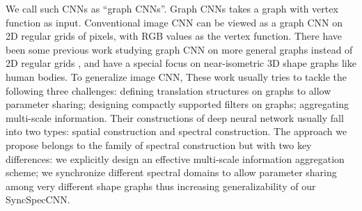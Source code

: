 We call such CNNs as ``graph CNNs''. Graph CNNs takes a graph with vertex function as input. Conventional image CNN can be viewed as a graph CNN on 2D regular grids of pixels, with RGB values as the vertex function. There have been some previous work studying graph CNN on more general graphs instead of 2D regular grids \cite{bruna2013spectral,duvenaud2015convolutional,henaff2015deep,defferrard2016convolutional}, and \cite{masci2015geodesic,boscaini2015learning,boscaini2016learning} have a special focus on near-isometric 3D shape graphs like human bodies. To generalize image CNN, These work usually tries to tackle the following three challenges: defining translation structures on graphs to allow parameter sharing; designing compactly supported filters on graphs; aggregating multi-scale information. Their constructions of deep neural network usually fall into two types: spatial construction and spectral construction. The approach we propose belongs to the family of spectral construction but with two key differences: we explicitly design an effective multi-scale information aggregation scheme; we synchronize different spectral domains to allow parameter sharing among very different shape graphs thus increasing generalizability of our SyncSpecCNN.
